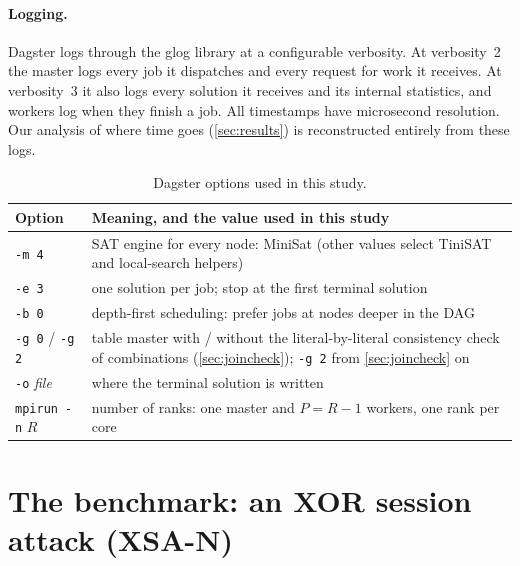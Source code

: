 \documentclass[11pt,a4paper]{article}
\newcommand{\XSA}{\textsf{XSA-N}}
\newcommand{\opt}[1]{\texttt{#1}}
\begin{document}
\paragraph{Logging.}
Dagster logs through the glog library at a configurable verbosity. At verbosity~2 the
master logs every job it dispatches and every request for work it receives. At
verbosity~3 it also logs every solution it receives and its internal statistics, and
workers log when they finish a job. All timestamps have microsecond resolution. Our
analysis of where time goes (\cref{sec:results}) is reconstructed entirely from these logs.

\begin{table}[htbp]
\centering\small
\begin{tabular}{@{}lp{}@{}}
\toprule
Option & Meaning, and the value used in this study \\
\midrule
\opt{-m 4}  & SAT engine for every node: MiniSat (other values select TiniSAT and local-search helpers) \\
\opt{-e 3}  & one solution per job; stop at the first terminal solution \\
\opt{-b 0}  & depth-first scheduling: prefer jobs at nodes deeper in the DAG \\
\opt{-g 0} / \opt{-g 2} & table master with / without the literal-by-literal consistency check of combinations (\cref{sec:joincheck}); \opt{-g 2} from \cref{sec:joincheck} on \\
\opt{-o} \textit{file} & where the terminal solution is written \\
\texttt{mpirun -n} $R$ & number of ranks: one master and $P=R-1$ workers, one rank per core \\
\bottomrule
\end{tabular}
\caption{Dagster options used in this study.}
\label{tab:options}
\end{table}

\section{The benchmark: an XOR session attack (\XSA)}
\label{sec:xsa}
\end{document}
